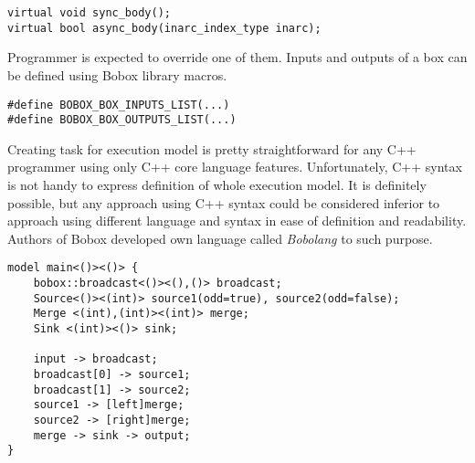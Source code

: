 \begin{lstlisting}[caption={Code representation of \emph{action} step.}, label={bobox_action}]
virtual void sync_body();
virtual bool async_body(inarc_index_type inarc);
\end{lstlisting}

Programmer is expected to override one of them. Inputs and outputs of a box can be defined using Bobox library macros.

\begin{lstlisting}[caption={Helpers for input and output definition.}, label={bobox_io}]
#define BOBOX_BOX_INPUTS_LIST(...)
#define BOBOX_BOX_OUTPUTS_LIST(...)
\end{lstlisting}

Creating task for execution model is pretty straightforward for any C++ programmer using only C++ core language features. Unfortunately, C++ syntax is not handy to express definition of whole execution model. It is definitely possible, but any approach using C++ syntax could be considered inferior to approach using different language and syntax in ease of definition and readability. Authors of Bobox developed own language called \emph{Bobolang} to such purpose.

\begin{lstlisting}[caption={Example of Bobolang usage from the Bobox project.}, label={bobox_bobolang}]
model main<()><()> {
	bobox::broadcast<()><(),()> broadcast;
	Source<()><(int)> source1(odd=true), source2(odd=false);
	Merge <(int),(int)><(int)> merge;
	Sink <(int)><()> sink;
	
	input -> broadcast;
	broadcast[0] -> source1;
	broadcast[1] -> source2;
	source1 -> [left]merge;
	source2 -> [right]merge;
	merge -> sink -> output;
}
\end{lstlisting}
